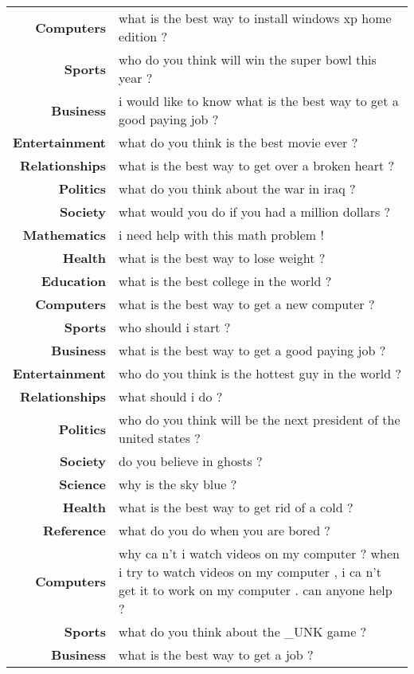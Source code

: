 \documentclass{article}
\begin{document}
\begin{table*}[!thbp]
\begin{tabular}{r  p{12cm}}
    {\bf Computers} & what is the best way to install windows xp home edition ? \\
    {\bf Sports} & who do you think will win the super bowl this year ? \\
    {\bf Business} & i would like to know what is the best way to get a good paying
                     job ? \\
    {\bf Entertainment} & what do you think is the best movie ever ? \\
    {\bf Relationships} & what is the best way to get over a broken heart ? \\
    {\bf Politics} & what do you think about the war in iraq ? \\
    \midrule
    {\bf Society} & what would you do if you had a million dollars ? \\
    {\bf Mathematics} & i need help with this math problem ! \\
    {\bf Health} & what is the best way to lose weight ? \\
    {\bf Education} & what is the best college in the world ? \\
    {\bf Computers} & what is the best way to get a new computer ? \\
    {\bf Sports} & who should i start ? \\
    {\bf Business} & what is the best way to get a good paying job ? \\
    {\bf Entertainment} & who do you think is the hottest guy in the world ? \\
    {\bf Relationships} & what should i do ? \\
    {\bf Politics} & who do you think will be the next president of the united states ? \\
    \midrule
    {\bf Society} & do you believe in ghosts ? \\
    {\bf Science} & why is the sky blue ? \\
    {\bf Health} & what is the best way to get rid of a cold ? \\
    {\bf Reference} & what do you do when you are bored ? \\
    {\bf Computers} & why ca n't i watch videos on my computer ? when i try to watch
                      videos on my computer , i ca n't get it to work on my computer
                      . can anyone help ? \\
    {\bf Sports} & what do you think about the \_UNK game ? \\
    {\bf Business} & what is the best way to get a job ? \\

\end{tabular}
\end{table*}
\end{document}
